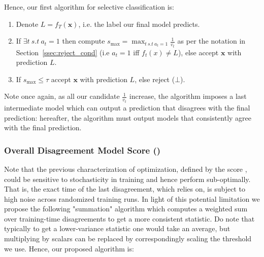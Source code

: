 Hence, our first algorithm for selective classification is:
\begin{enumerate}
    \item Denote $L = f_T(\bm{x})$, i.e. the label our final model predicts.
    \item If $\exists t~s.t~a_t =1$ then compute $s_\text{max} = \max_{t~s.t~a_t = 1} \frac{1}{v_t}$ as per the notation in Section~\ref{ssec:reject_cond} (i.e $a_t = 1$ iff $f_t(x) \neq L$), else accept $\bm{x}$ with prediction $L$.
    \item If $s_\text{max} \leq \tau$ accept $\bm{x}$ with prediction $L$, else reject ($\bot$).
\end{enumerate}
Note once again, as all our candidate $\frac{1}{v_t}$ increase, the algorithm imposes a last intermediate model which can output a prediction that disagrees with the final prediction: hereafter, the algorithm must output models that consistently agree with the final prediction.

\subsubsection{Overall Disagreement Model Score (\ssum)}
\label{ssec:avg_score}

Note that the previous characterization of optimization, defined by the score \smax, could be sensitive to stochasticity in training and hence perform sub-optimally. %
That is, the exact time of the last disagreement, which \smax relies on, is subject to high noise across randomized training runs. %
In light of this potential limitation we propose the following "summation" algorithm which computes a weighted sum over training-time disagreements to get a more consistent statistic. Do note that typically to get a lower-variance statistic one would take an average, but multiplying by scalars can be replaced by correspondingly scaling the threshold we use. Hence, our proposed algorithm is:%

